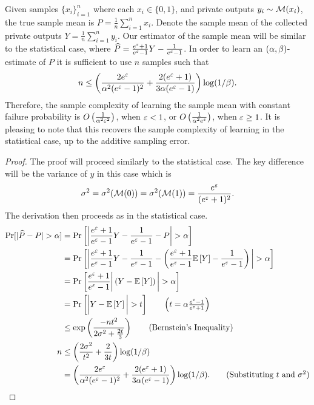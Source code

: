 \begin{lemma}
\label{lem:empirical-coin-learn-rr}
    Given samples $\{x_i\}_{i=1}^n$ where each $x_i\in\{0,1\}$, and private outputs $y_i\sim \mathcal{M}(x_i)$, the true sample mean is $P=\frac{1}{n}\sum_{i=1}^n x_i$. Denote the sample mean of the collected private outputs $Y=\frac{1}{n}\sum_{i=1}^n y_i$. Our estimator of the sample mean will be similar to the statistical case, where $\widehat{P}=\frac{e^\varepsilon + 1}{e^\varepsilon - 1}Y - \frac{1}{e^\varepsilon - 1}$. In order to learn an $(\alpha,\beta)$-estimate of $P$ it is sufficient to use $n$ samples such that 
    \begin{equation*}
        n\leq\left( \frac{2e^\varepsilon}{\alpha^2 (e^\varepsilon - 1)^2} + \frac{2(e^\varepsilon + 1)}{3\alpha (e^\varepsilon - 1)} \right)\log(1/\beta).
    \end{equation*}
    Therefore, the sample complexity of learning the sample mean with constant failure probability is $O\left(\frac{1}{\alpha^2\varepsilon^2}\right)$, when $\varepsilon<1$, or $O\left(\frac{1}{\alpha^2e^\varepsilon} \right)$, when $\varepsilon\geq 1$. It is pleasing to note that this recovers the sample complexity of learning in the statistical case, up to the additive sampling error.
\end{lemma}

\begin{proof}
    The proof will proceed similarly to the statistical case. The key difference will be the variance of $y$ in this case which is
    \[
    \sigma^2=\sigma^2(\mathcal{M}(0))=\sigma^2(\mathcal{M}(1))=\frac{e^\varepsilon}{(e^\varepsilon + 1)^2}.
    \]
    The derivation then proceeds as in the statistical case.
    \begin{align*}
        \Pr[|\widehat{P}-P|>\acc] &= \Pr\left[\bigg| \frac{e^\priv + 1}{e^\priv - 1}Y - \frac{1}{e^\priv - 1} - P\bigg| >\acc\right]\\
            &=\Pr\left[\bigg| \frac{e^\priv + 1}{e^\priv - 1}Y - \frac{1}{e^\priv - 1} - \left( \frac{e^\priv + 1}{e^\priv - 1}\bEE{Y} - \frac{1}{e^\priv - 1} \right)\bigg|>\acc \right]\\
            &= \Pr\left[\frac{e^\priv + 1}{e^\priv - 1}\bigg| \left(Y-\bEE{Y} \right)\bigg|>\acc \right]\\
            &=\Pr\left[\bigg| Y-\bEE{Y}\bigg|> t \right]\tag*{$\left(t=\acc\frac{e^\priv - 1}{e^\priv + 1}\right)$}\\
            &\leq \exp\left(\frac{-nt^2}{2\sigma^2 + \frac{2t}{3}}\right)\tag{Bernstein's Inequality}\\
        n   &\leq \left( \frac{2\sigma^2}{t^2} + \frac{2}{3t} \right)\log(1/\failp)\\
            &=\left(\frac{2e^\priv}{\acc^2 (e^\priv - 1)^2} + \frac{2(e^\priv + 1)}{3\acc(e^\priv - 1)} \right)\log(1/\failp).\tag{Substituting $t$ and $\sigma^2$}
    \end{align*}
\end{proof}

